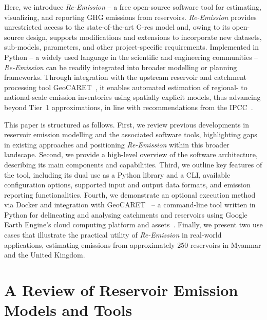 \documentclass[final,1p,times]{elsarticle}
\begin{document}
Here, we introduce \textit{Re-Emission} -- a free open-source software tool for estimating, visualizing, and reporting \ac{GHG} emissions from reservoirs. 
\textit{Re-Emission} provides unrestricted access to the state-of-the-art G-res model and, owing to its open-source design, supports modifications and extensions to incorporate new datasets, sub-models, parameters, and other project-specific requirements. 
Implemented in Python -- a widely used language in the scientific and engineering communities -- \textit{Re-Emission} can be readily integrated into broader modelling or planning frameworks. 
Through integration with the upstream reservoir and catchment processing tool GeoCARET~\citep{heettool}, it enables automated estimation of regional- to national-scale emission inventories using spatially explicit models, thus advancing beyond Tier~1 approximations, in line with recommendations from the IPCC~\citep{IPCC2019}.

This paper is structured as follows.
First, we review previous developments in reservoir emission modelling and the associated software tools, highlighting gaps in existing approaches and positioning \textit{Re-Emission} within this broader landscape.
Second, we provide a high-level overview of the software architecture, describing its main components and capabilities.
Third, we outline key features of the tool, including its dual use as a Python library and a \ac{CLI}, available configuration options, supported input and output data formats, and emission reporting functionalities.
Fourth, we demonstrate an optional execution method via Docker and integration with GeoCARET~\cite{heettool} -- a command-line tool written in Python for delineating and analysing catchments and reservoirs using Google Earth Engine's cloud computing platform and assets~\cite{Gorelick2017}. 
Finally, we present two use cases that illustrate the practical utility of \textit{Re-Emission} in real-world applications, estimating emissions from approximately 250 reservoirs in Myanmar and the United Kingdom.


\section{A Review of Reservoir Emission Models and Tools}
\label{sec:related_work}
\end{document}
